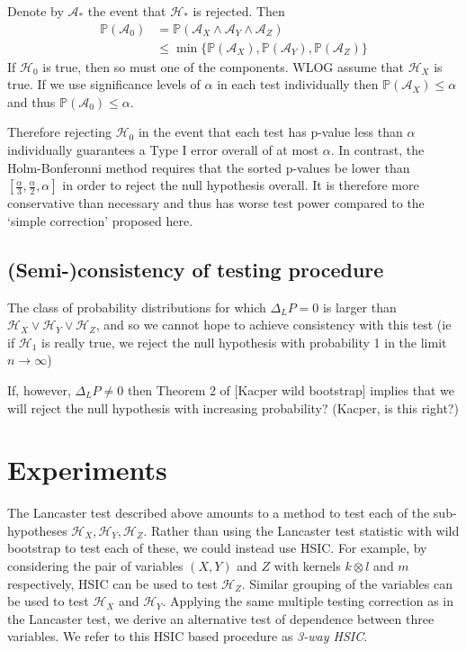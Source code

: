\documentclass[]{article}
\begin{document}
Denote by $\mathcal{A}_*$ the event that $\mathcal{H}_*$ is rejected. Then
\begin{align*}
\mathbb{P}(\mathcal{A}_0) &= \mathbb{P}(\mathcal{A}_X \land \mathcal{A}_Y \land \mathcal{A}_Z) \\
&\leq \min\{\mathbb{P}(\mathcal{A}_X), \mathbb{P}(\mathcal{A}_Y), \mathbb{P}(\mathcal{A}_Z)\}
\end{align*}
If $\mathcal{H}_0$ is true, then so must one of the components. WLOG assume that $\mathcal{H}_X$ is true. If we use significance levels of $\alpha$ in each test individually then $\mathbb{P}(\mathcal{A}_X) \leq \alpha$ and thus $\mathbb{P}(\mathcal{A}_0) \leq \alpha$.

Therefore rejecting $\mathcal{H}_0$ in the event that each test has p-value less than $\alpha$ individually guarantees a Type I error overall of at most $\alpha$. In contrast, the Holm-Bonferonni method requires that the sorted p-values be lower than $[\frac{\alpha}{3},\frac{\alpha}{2},\alpha]$ in order to reject the null hypothesis overall. It is therefore more conservative than necessary and thus has worse test power compared to the `simple correction' proposed here.


\subsection{(Semi-)consistency of testing procedure}

The class of probability distributions for which $\Delta_LP=0$ is larger than $\mathcal{H}_X \lor \mathcal{H}_Y \lor\mathcal{H}_Z$, and so we cannot hope to achieve consistency with this test (ie if $\mathcal{H}_1$ is really true, we reject the null hypothesis with probability 1 in the limit $n\longrightarrow\infty$)

If, however, $\Delta_LP \not =0$ then Theorem 2 of [Kacper wild bootstrap] implies that we will reject the null hypothesis with increasing probability? (Kacper, is this right?)



\section{Experiments}

The Lancaster test described above amounts to a method to test each of the sub-hypotheses $\mathcal{H}_X, \mathcal{H}_Y, \mathcal{H}_Z$. Rather than using the Lancaster test statistic with wild bootstrap to test each of these, we could instead use HSIC. For example, by considering the pair of variables $(X,Y)$ and $Z$ with kernels $k\otimes l$ and $m$ respectively, HSIC can be used to test $\mathcal{H}_Z$. Similar grouping of the variables can be used to test $\mathcal{H}_X$ and $\mathcal{H}_Y$. Applying the same multiple testing correction as in the Lancaster test, we derive an alternative test of dependence between three variables. We refer to this HSIC based procedure as \emph{3-way HSIC}.
\end{document}
